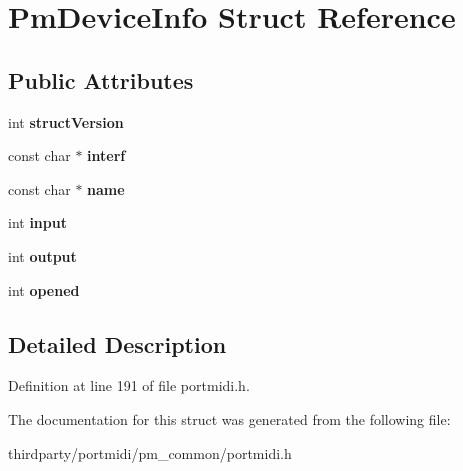 \hypertarget{struct_pm_device_info}{}\section{Pm\+Device\+Info Struct Reference}
\label{struct_pm_device_info}
\subsection*{Public Attributes}
\begin{DoxyCompactItemize}
\item 
\mbox{\label{struct_pm_device_info_ab2b405d77d62c45105703d8b25177665}} 
int {\bfseries struct\+Version}
\item 
\mbox{\label{struct_pm_device_info_a8c83e0e882db5a980a007437a806363b}} 
const char $\ast$ {\bfseries interf}
\item 
\mbox{\label{struct_pm_device_info_a5f708c92e58b1c77454bffeee1d7c61c}} 
const char $\ast$ {\bfseries name}
\item 
\mbox{\label{struct_pm_device_info_a9447230099afd8efc3f57906a02f6eba}} 
int {\bfseries input}
\item 
\mbox{\label{struct_pm_device_info_a0e395068e4eee637cc576541884d7e69}} 
int {\bfseries output}
\item 
\mbox{\label{struct_pm_device_info_ab4d3d62344b0c525d444bd844e7d70eb}} 
int {\bfseries opened}
\end{DoxyCompactItemize}


\subsection{Detailed Description}


Definition at line 191 of file portmidi.\+h.



The documentation for this struct was generated from the following file\+:\begin{DoxyCompactItemize}
\item 
thirdparty/portmidi/pm\+\_\+common/portmidi.\+h\end{DoxyCompactItemize}
